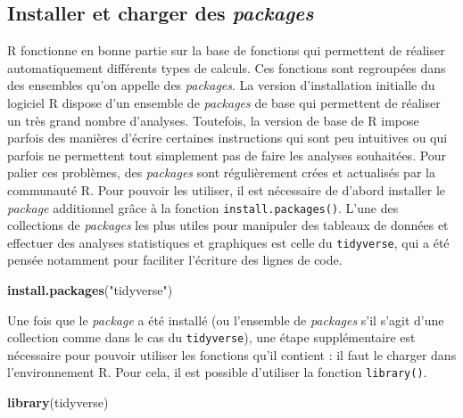 \documentclass[
  french,
]{book}
\newenvironment{Shaded}{\begin{snugshade}}{\end{snugshade}}
\newcommand{\KeywordTok}[1]{\textcolor[rgb]{0.13,0.29,0.53}{\textbf{#1}}}
\newcommand{\NormalTok}[1]{#1}
\newcommand{\StringTok}[1]{\textcolor[rgb]{0.31,0.60,0.02}{#1}}
\begin{document}
\hypertarget{installer-et-charger-des-packages}{%
\subsection{\texorpdfstring{Installer et charger des \emph{packages}}{Installer et charger des packages}}\label{installer-et-charger-des-packages}}

R fonctionne en bonne partie sur la base de fonctions qui permettent de réaliser automatiquement différents types de calculs. Ces fonctions sont regroupées dans des ensembles qu'on appelle des \emph{packages}. La version d'installation initialle du logiciel R dispose d'un ensemble de \emph{packages} de base qui permettent de réaliser un très grand nombre d'analyses. Toutefois, la version de base de R impose parfois des manières d'écrire certaines instructions qui sont peu intuitives ou qui parfois ne permettent tout simplement pas de faire les analyses souhaitées. Pour palier ces problèmes, des \emph{packages} sont régulièrement crées et actualisés par la communauté R. Pour pouvoir les utiliser, il est nécessaire de d'abord installer le \emph{package} additionnel grâce à la fonction \texttt{install.packages()}. L'une des collections de \emph{packages} les plus utiles pour manipuler des tableaux de données et effectuer des analyses statistiques et graphiques est celle du \texttt{tidyverse}, qui a été pensée notamment pour faciliter l'écriture des lignes de code.

\begin{Shaded}
\begin{Highlighting}[]
\KeywordTok{install.packages}\NormalTok{(}\StringTok{"tidyverse"}\NormalTok{)}
\end{Highlighting}
\end{Shaded}

Une fois que le \emph{package} a été installé (ou l'ensemble de \emph{packages} s'il s'agit d'une collection comme dans le cas du \texttt{tidyverse}), une étape supplémentaire est nécessaire pour pouvoir utiliser les fonctions qu'il contient : il faut le charger dans l'environnement R. Pour cela, il est possible d'utiliser la fonction \texttt{library()}.

\begin{Shaded}
\begin{Highlighting}[]
\KeywordTok{library}\NormalTok{(tidyverse)}
\end{Highlighting}
\end{Shaded}
\end{document}
